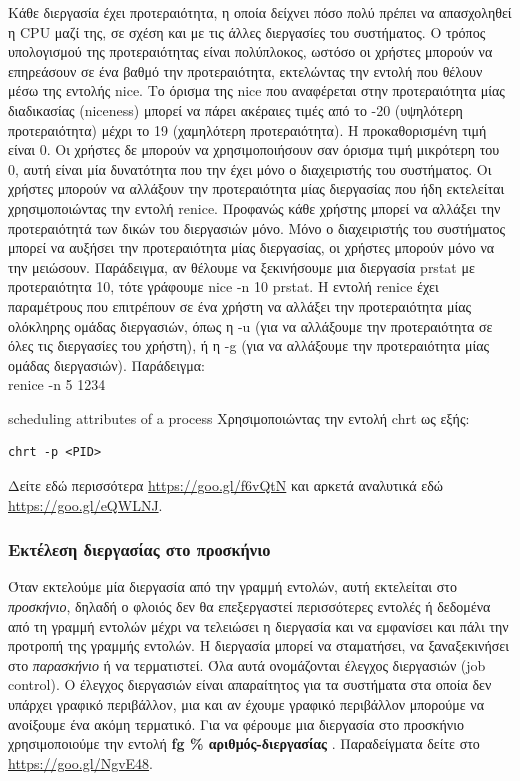 Κάθε διεργασία έχει προτεραιότητα, η οποία δείχνει πόσο πολύ πρέπει να  απασχοληθεί η CPU μαζί της, σε σχέση και με τις άλλες διεργασίες του συστήματος. 
Ο τρόπος υπολογισμού της προτεραιότητας είναι πολύπλοκος, ωστόσο οι χρήστες μπορούν να επηρεάσουν σε ένα βαθμό την προτεραιότητα, εκτελώντας την εντολή που θέλουν μέσω της εντολής nice. Το όρισμα της nice που αναφέρεται στην προτεραιότητα μίας διαδικασίας (niceness) μπορεί να πάρει ακέραιες τιμές από το -20 (υψηλότερη προτεραιότητα) μέχρι το 19 (χαμηλότερη προτεραιότητα). Η προκαθορισμένη τιμή
είναι 0. 
Οι χρήστες δε μπορούν να χρησιμοποιήσουν σαν όρισμα τιμή μικρότερη του 0, αυτή είναι μία δυνατότητα που την έχει μόνο ο
διαχειριστής του συστήματος. Οι χρήστες μπορούν να αλλάξουν την προτεραιότητα μίας διεργασίας που ήδη εκτελείται χρησιμοποιώντας την εντολή
renice. Προφανώς κάθε χρήστης μπορεί να αλλάξει την προτεραιότητά των δικών του διεργασιών μόνο. Μόνο ο διαχειριστής του συστήματος μπορεί
να αυξήσει την προτεραιότητα μίας διεργασίας, οι χρήστες μπορούν μόνο να την μειώσουν. 
Παράδειγμα, αν θέλουμε να ξεκινήσουμε μια διεργασία prstat με προτεραιότητα 10, τότε γράφουμε nice -n 10 prstat.
Η εντολή renice έχει παραμέτρους που επιτρέπουν σε
ένα χρήστη να αλλάξει την προτεραιότητα μίας ολόκληρης ομάδας διεργασιών, όπως η -u (για να αλλάξουμε την προτεραιότητα σε όλες τις
διεργασίες του χρήστη), ή η -g (για να αλλάξουμε την προτεραιότητα μίας ομάδας διεργασιών). Παράδειγμα: \\
renice -n 5 1234

\begin{mybox}{scheduling attributes of a process}
Χρησιμοποιώντας την εντολή chrt ως εξής:
\begin{lstlisting}
chrt -p <PID>
\end{lstlisting}
Δείτε εδώ περισσότερα \href{https://goo.gl/f6vQtN}{https://goo.gl/f6vQtN} και αρκετά αναλυτικά εδώ \href{https://goo.gl/eQWLNJ}{https://goo.gl/eQWLNJ}.
\end{mybox}
\subsubsection{Εκτέλεση διεργασίας στο προσκήνιο}


Όταν εκτελούμε μία διεργασία από την γραμμή εντολών, αυτή εκτελείται στο \textit{προσκήνιο},  δηλαδή ο φλοιός δεν θα επεξεργαστεί
περισσότερες εντολές ή δεδομένα από τη γραμμή εντολών μέχρι να τελειώσει η διεργασία και να εμφανίσει και πάλι την προτροπή της γραμμής
εντολών. Η διεργασία μπορεί να σταματήσει, να ξαναξεκινήσει στο \textit{παρασκήνιο} ή να τερματιστεί. Όλα αυτά ονομάζονται έλεγχος
διεργασιών (job control). Ο έλεγχος διεργασιών είναι απαραίτητος για τα συστήματα στα οποία δεν υπάρχει γραφικό περιβάλλον, μια και αν
έχουμε γραφικό περιβάλλον μπορούμε να ανοίξουμε ένα ακόμη τερματικό. Για να φέρουμε μια διεργασία στο προσκήνιο χρησιμοποιούμε την εντολή 
\textbf{fg \% αριθμός-διεργασίας }. Παραδείγματα δείτε στο \href{https://goo.gl/NgvE48}{https://goo.gl/NgvE48}.


